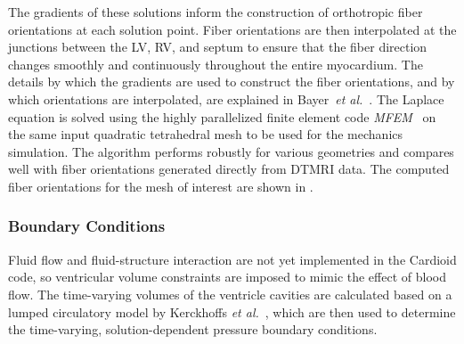 The gradients of these solutions inform the construction of orthotropic fiber orientations at each solution point. Fiber orientations are then interpolated at the junctions between the LV, RV, and septum to ensure that the fiber direction changes smoothly and continuously throughout the entire myocardium. The details by which the gradients are used to construct the fiber orientations, and by which orientations are interpolated, are explained in Bayer~\textit{et al.}~\cite{bayer_2012}. The Laplace equation is solved using the highly parallelized finite element code \textit{MFEM}~\cite{mfem-library} on the same input quadratic tetrahedral mesh to be used for the mechanics simulation. The algorithm performs robustly for various geometries and compares well with fiber orientations generated directly from DTMRI data. The computed fiber orientations for the mesh of interest are shown in .

\subsubsection{Boundary Conditions}
\label{Boundary Conditions}

Fluid flow and fluid-structure interaction are not yet implemented in the Cardioid code, so ventricular volume constraints are imposed to mimic the effect of blood flow. The time-varying volumes of the ventricle cavities are calculated based on a lumped circulatory model by Kerckhoffs \textit{et al.}~\cite{kerckhoffs_2006}, which are then used to determine the time-varying, solution-dependent pressure boundary conditions.

